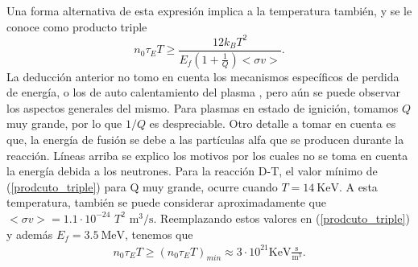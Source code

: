 \documentclass[../main.tex]{subfiles}
\begin{document}
        Una forma alternativa de esta expresión implica a la temperatura también, y se le conoce como producto triple
        \begin{equation}
            n_0\tau_ET \geq \frac{12k_BT^2}{E_f\left( 1+\frac{1}{Q} \right)<\sigma v>}. \label{prodcuto_triple}
        \end{equation}
        La deducción anterior no tomo en cuenta los mecanismos específicos de perdida de energía, o los de auto calentamiento del plasma \cite{morse2018fusion}, pero aún se puede observar los aspectos generales del mismo. Para plasmas en estado de ignición, tomamos $Q$ muy grande, por lo que $1/Q$ es despreciable. Otro detalle a tomar en cuenta es que, la
        energía de fusión se debe a las partículas alfa que se producen durante la reacción. Líneas arriba se explico los motivos por los cuales
        no se toma en cuenta la energía debida a los neutrones. Para la reacción D-T, el valor mínimo de (\ref{prodcuto_triple}) para Q muy grande, ocurre cuando $T=14 \ \mathrm{KeV}$. A esta temperatura, también se puede considerar aproximadamente que $<\sigma v> = 1.1 \cdot 10^{-24}$ $T^2$ $\mathrm{m^3/s}$. Reemplazando estos valores en (\ref{prodcuto_triple}) y además $E_f = 3.5 \ \mathrm{MeV}$, tenemos que
        \begin{align}
            n_0\tau_ET \geq (n_0\tau_ET)_{min} \approx 3 \cdot 10^{21} \mathrm{KeV \frac{s}{m^3}}.
        \end{align}
        
	
\end{document}
